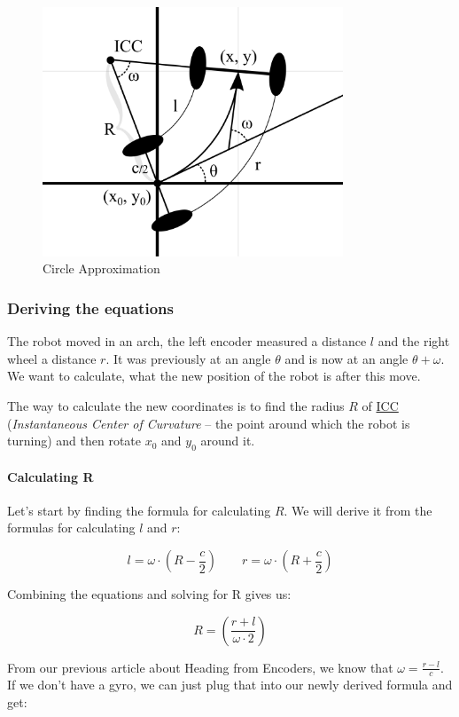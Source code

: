 \documentclass[12pt,twoside]{article}
\let\subsubsubsection\paragraph
\begin{document}
\begin{figure}[H]
\centering
\includegraphics[width=0.8\textwidth]{../assets/images/odometry/circle-approximation.png}
\caption{Circle Approximation}
\end{figure}

\subsubsection{Deriving the equations}
The robot moved in an arch, the left encoder measured a distance $l$ and the right wheel a distance $r$. It was previously at an angle $\theta$ and is now at an angle $\theta + \omega$. We want to calculate, what the new position of the robot is after this move.

The way to calculate the new coordinates is to find the radius $R$ of \href{https://en.wikipedia.org/wiki/Instant_centre_of_rotation}{ICC} (\textit{Instantaneous Center of Curvature} -- the point around which the robot is turning) and then rotate $x_0$ and $y_0$ around it.


\subsubsubsection{Calculating R}
Let's start by finding the formula for calculating $R$. We will derive it from the formulas for calculating $l$ and $r$:

\vspace{-\parskip}\[l = \omega \cdot \left(R - \frac{c}{2}\right) \qquad r = \omega \cdot \left(R + \frac{c}{2}\right)\]

Combining the equations and solving for R gives us:

\vspace{-\parskip}\[R = \left(\frac{r+l}{\omega \cdot 2} \right)\]

From our previous article about Heading from Encoders, we know that $\omega = \frac{r - l}{c}$. If we don't have a gyro, we can just plug that into our newly derived formula and get:
\end{document}
